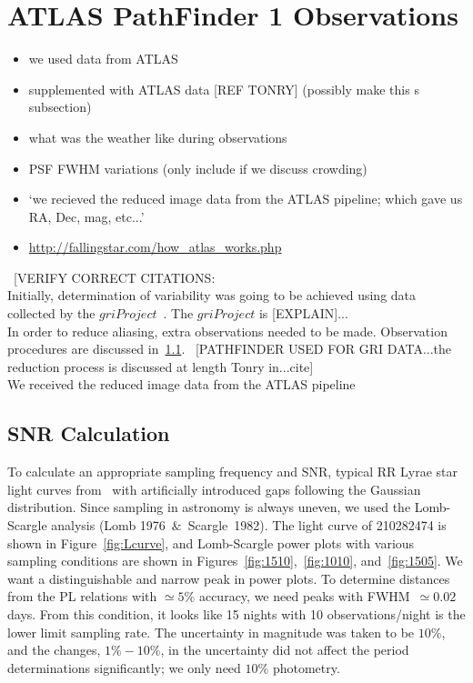 \documentclass[aps,prb,twocolumn,superscriptaddress]{revtex4-1}
\begin{document}
\section{ATLAS PathFinder 1 Observations}
\begin{itemize}
	\item{} we used data from ATLAS
	\item{} supplemented with ATLAS data [REF TONRY] (possibly make this s subsection)
	\item{} what was the weather like during observations
	\item{} PSF FWHM variations (only include if we discuss crowding)
	\item{} `we recieved the reduced image data from the ATLAS pipeline; which gave us RA, Dec, mag, etc...'
	\item{}\url{http://fallingstar.com/how_atlas_works.php}
\end{itemize}


~[VERIFY CORRECT CITATIONS:\\%
Initially, determination of variability was going to be achieved using data collected by the $gri Project$~\cite{gri}.  The $gri Project$ is [EXPLAIN]...\\
In order to reduce aliasing, extra observations needed to be made.  Observation procedures are discussed in~\cref{sec:data}.
~[PATHFINDER USED FOR GRI DATA...the reduction process is discussed at length Tonry in...cite]\\
We received the reduced image data from the ATLAS pipeline~\cite{PSpipe}~\cite{tonrypipe}


\subsection{SNR Calculation}\label{sec:data}

\noindent To calculate an appropriate sampling frequency and SNR, typical RR Lyrae star light curves from~\cite{RRLyrae} with artificially introduced gaps following the Gaussian distribution. Since sampling in astronomy is always uneven, we used the Lomb-Scargle analysis (Lomb 1976~$\&$~Scargle~1982). The light curve of 210282474 is shown in Figure~\ref{fig:Lcurve}, and Lomb-Scargle power plots with various sampling conditions are shown in Figures~\ref{fig:1510},~\ref{fig:1010}, and~\ref{fig:1505}. We want a distinguishable and narrow peak in power plots. To determine distances from the PL relations with $\simeq5\%$ accuracy, we need peaks with FWHM~$ \simeq 0.02$ days. From this condition, it looks like 15 nights with 10 observations/night is the lower limit sampling rate. The uncertainty in magnitude was taken to be $10\%$, and the changes, $1\% - 10\%$, in the uncertainty did not affect the period determinations significantly; we only need $10\%$ photometry.
\end{document}
